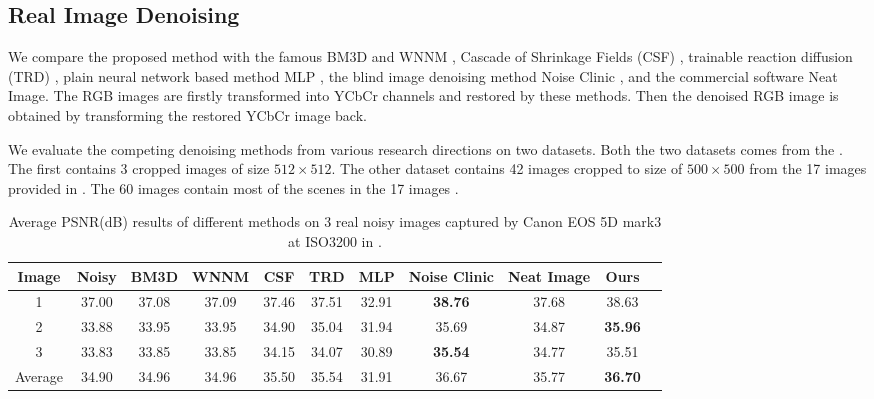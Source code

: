 \documentclass[10pt,twocolumn,letterpaper]{article}
\begin{document}
\subsection{Real Image Denoising}
We compare the proposed method with the famous BM3D \cite{bm3d} and WNNM \cite{wnnm}, Cascade of Shrinkage Fields (CSF) \cite{csf}, trainable reaction diffusion (TRD) \cite{chen2015learning}, plain neural network based method MLP \cite{burger2012image}, the blind image denoising method Noise Clinic \cite{noiseclinic}, and the commercial software Neat Image. The RGB images are firstly transformed into YCbCr channels and restored by these methods. Then the denoised RGB image is obtained by transforming the restored YCbCr image back.

We evaluate the competing denoising methods from various research directions on two datasets. Both the two datasets comes from the \cite{crosschannel2016}. The first contains 3 cropped images of size $512\times512$. The other dataset contains 42 images cropped to size of $500\times500$ from the 17 images provided in \cite{crosschannel2016}. The 60 images contain most of the scenes in the 17 images \cite{crosschannel2016}.
\begin{table}
\caption{Average PSNR(dB) results of different methods on 3 real noisy images captured by Canon EOS 5D mark3 at ISO3200 in \cite{crosschannel2016}.}
\label{tab1}
\begin{center}
\renewcommand\arraystretch{1}
\begin{tabular}{|c||c|c|c|c|c|c|c|c|c|c|}
\hline
Image & \textbf{Noisy} &\textbf{BM3D}&\textbf{WNNM}&\textbf{CSF}&\textbf{TRD}&\textbf{MLP}& \textbf{Noise Clinic}& \textbf{Neat Image}&\textbf{Ours}
\\
\hline
1& 37.00 & 37.08 & 37.09 &  37.46  &  37.51  &  32.91  & \textbf{ 38.76}  & 37.68   & 38.63  
\\
\hline
2& 33.88 & 33.95  &  33.95  &  34.90  &  35.04  & 31.94   &  35.69  &  34.87  & \textbf{ 35.96 }
\\
\hline
3& 33.83  & 33.85  & 33.85   & 34.15   &   34.07 & 30.89   & \textbf{35.54 }  &  34.77  &  35.51 
\\
\hline
Average & 34.90  &  34.96 &  34.96  & 35.50   & 35.54   &  31.91  &  36.67  &  35.77  &  \textbf{ 36.70}
\\
\hline
\end{tabular}
\end{center}
\end{table}
\end{document}
